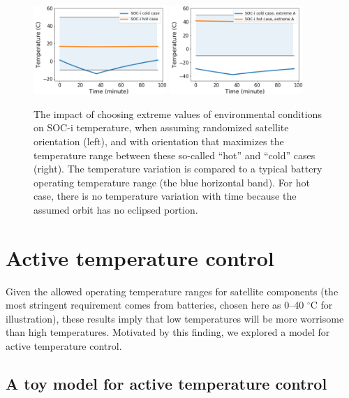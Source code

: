\documentclass[]{aastex62}
\begin{document}
\begin{figure}[t!]
\centering
\includegraphics[width=0.45\textwidth, keepaspectratio]{figures/TempsPlot_SOCi-hotVScold.png} 
\includegraphics[width=0.45\textwidth, keepaspectratio]{figures/TempsPlot_SOCi-hotVScoldExtremeA.png} 

\caption{The impact of choosing extreme values of environmental conditions on SOC-i temperature,  
when assuming randomized satellite orientation (left), and with orientation that maximizes the temperature 
range between these so-called ``hot'' and ``cold'' cases (right). The temperature variation is compared to 
a typical battery operating temperature range (the blue horizontal band).  For hot case, there is no 
temperature variation with time because the assumed orbit has no eclipsed portion. 
\label{fig:SOCi1}}
\end{figure}


\section{Active temperature control \label{sec:active}} 

Given the allowed operating temperature ranges for satellite components (the most stringent requirement
comes from batteries, chosen here as 0--40 $^\circ$C for illustration), these results imply that 
low temperatures will be more worrisome than high temperatures. Motivated by this finding, we 
explored a model for active temperature control.




\subsection{A toy model for active temperature control } 
\end{document}
